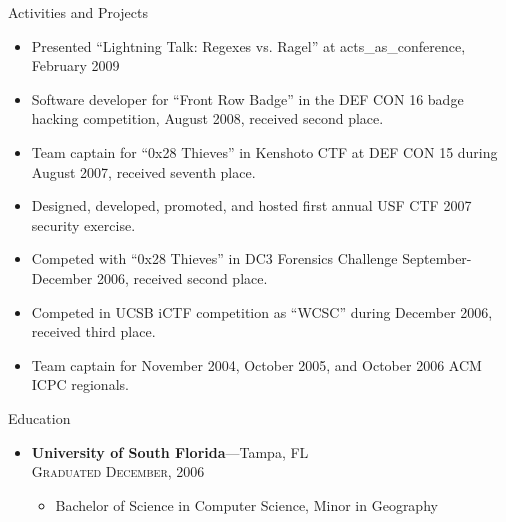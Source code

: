 \documentclass[11pt,oneside]{article}
\newenvironment{ressection}[1]{
	\vspace{2pt}
	{\selectfont\Large#1}
	\begin{itemize}
	\vspace{3pt}
}{
	\end{itemize}
}
\newcommand{\resitem}[1]{
	\vspace{-4pt}
	\item \begin{flushleft} #1 \end{flushleft}
}
\newcommand{\ressubitem}[1]{
	\vspace{-1pt}
	\item \begin{flushleft} #1 \end{flushleft}
}
\newcommand{\resbigitem}[3]{
	\vspace{-5pt}
	\item
	\textbf{#1}---#2 \\
	\textsc{#3}
}
\newenvironment{ressubsec}[3]{
	\resbigitem{#1}{#2}{#3}
	\vspace{-2pt}
	\begin{itemize}
}{
	\end{itemize}
}
\begin{document}

\begin{ressection}{Activities and Projects}
  \resitem{Presented ``Lightning Talk: Regexes vs. Ragel'' at acts\_as\_conference, February 2009}
	\resitem{Software developer for ``Front Row Badge'' in the DEF CON 16 badge hacking competition, August 2008, received second place.}
		\resitem{Team captain for ``0x28 Thieves'' in Kenshoto CTF at DEF CON 15 during August 2007, received seventh place.}
		\resitem{Designed, developed, promoted, and hosted first annual USF CTF 2007 security exercise.}
		\resitem{Competed with ``0x28 Thieves'' in DC3 Forensics Challenge September-December 2006, received second place.}

		\resitem{Competed in UCSB iCTF competition as ``WCSC'' during December 2006, received third place.}
	

		\resitem{Team captain for November 2004, October 2005, and October 2006 ACM ICPC regionals.}
		
\end{ressection}

\begin{ressection}{Education}

	\begin{ressubsec}{University of South Florida}{Tampa, FL}{Graduated December, 2006}
		\ressubitem{Bachelor of Science in Computer Science, Minor in Geography}
	\end{ressubsec}

\end{ressection}
\end{document}
